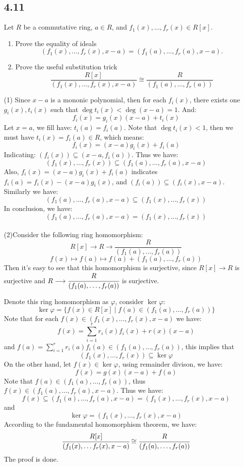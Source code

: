 \documentclass[a4paper, pdf, 12pt]{article}
\makeatletter
\renewenvironment{proof}[1][\proofname]{\par
  \pushQED{\qed}%
  \normalfont \topsep6\p@\@plus6\p@\relax
  \trivlist
  \item[%
    \hskip\labelsep
    \normalfont\bfseries %
    #1%
    \@addpunct{.}%
  ]\ignorespaces
}{%
  \popQED\endtrivlist\@endpefalse
}
\let\qed\relax %
\DeclareRobustCommand{\qed}{%
  \ifmmode \mathqed
  \else
    \leavevmode\unskip\penalty\@M\hbox{}\nobreak\hspace{.5em minus .1em}%
    \hbox{\qedsymbol}%
  \fi
}
\makeatother
\begin{document}
\subsection*{4.11}
Let $R$ be a commutative ring, $a \in R$, and 
$f_1(x), \ldots , f_r(x) \in R[x]$.
\begin{enumerate}
  \item Prove the equality of ideals
  $$
  (f_1 (x), \ldots, f_r (x), x - a) = (f_1 (a), \ldots , f_r (a), x - a) .
  $$

  \item Prove the useful substitution trick
  $$
  \frac{R[x]}{(f_1(x), \ldots, f_r(x), x-a)}\cong 
  \frac{R}{(f_1(a), \ldots, f_r(a))}
  $$
\end{enumerate}
\begin{proof}
  (1) Since $x-a$ is a mononic polynomial, then for each $f_i(x)$, there exists one 
  $g_i(x), t_i(x)$ such that $\deg t_i(x) < \deg (x-a) = 1$. And:
  $$
  f_i(x) = g_i(x)(x-a) + t_i(x)
  $$
  Let $x=a$, we fill have: $t_i(a) = f_i(a)$. Note that $\deg t_i(x) < 1$, then we must 
  have $t_i(x) = f_i(a)\in R$, which means:
  $$
  f_i(x) = (x-a)g_i(x) + f_i(a)
  $$
  Indicating: $(f_i(x))\subseteq (x-a, f_i(a))$. Thus we have:
  $$
  (f_1(x), \ldots ,f_r(x))\subseteq (f_1(a), \ldots , f_r(a), x-a)
  $$
  Also, $f_i(x) = (x-a)g_i(x) + f_i(a)$ indicates $f_i(a) = f_i(x) - (x-a)g_i(x)$, and $(f_i(a))\subseteq (f_i(x), x-a)$. Similarly 
  we have:
  $$
  (f_1(a), \ldots , f_r(a), x-a)\subseteq(f_1(x), \ldots ,f_r(x))
  $$
  In conclusion, we have:
  $$
  (f_1(a), \ldots , f_r(a), x-a) = (f_1(x), \ldots ,f_r(x))
  $$\\
  (2)Consider the following ring homomorphism:
  $$
  R[x]\longrightarrow R \longrightarrow \frac{R}{(f_1(a),\ldots,f_r(a))}
  $$
  $$
  f(x)\mapsto f(a)\mapsto f(a) + (f_1(a),\ldots, f_r(a))
  $$
  Then it's easy to see that this homomorphism is surjective, since $R[x]\longrightarrow R$ is surjective 
  and $R\longrightarrow \cfrac{R}{(f_1(a),\ldots, f_r(a))}$ is surjective.

  Denote this ring homomorphism as $\varphi$, consider $\ker \varphi$:
  $$
  \ker \varphi = \{f(x)\in R[x]\mid f(a) \in (f_1(a), \ldots, f_r(a))\}
  $$
  Note that for each $f(x)\in (f_1(x),\ldots, f_r(x), x-a)$ we have:
  $$
  f(x) = \sum_{i=1}^{r}r_i(x)f_i(x) + r(x)(x-a)
  $$ and $f(a) = \sum_{i=1}^{r}r_i(a)f_i(a)\in (f_1(a),\ldots,f_r(a))$, this implies that 
  $$
  (f_1(x), \ldots, f_r(x))\subseteq \ker \varphi
  $$
  On the other hand, let $f(x)\in \ker\varphi$, using remainder divison, we have:
  $$
  f(x) = g(x)(x-a) + f(a)
  $$
  Note that $f(a)\in (f_1(a), \ldots, f_r(a))$, thus $f(x)\in (f_1(a),\ldots, f_r(a), x-a)$. Thus we have:
  $$
  f(x)\subseteq (f_1(a), \ldots, f_r(a), x-a) = (f_1(x),\ldots, f_r(x), x-a)
  $$ and $$
  \ker \varphi = (f_1(x),\ldots, f_r(x), x-a)
  $$
  According to the fundamental homomorphism theorem, we have:
  $$
  \cfrac{R[x]}{(f_1(x),\ldots f_r(x), x-a)}\cong \cfrac{R}{(f_1(a), \ldots, f_r(a))}
  $$
  The proof is done.
\end{proof}
\end{document}
